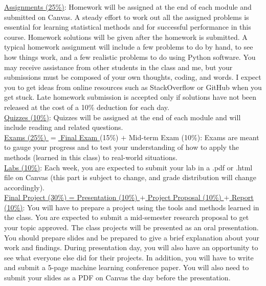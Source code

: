 \documentclass[11pt, a4paper]{article}
\begin{document}
\noindent \underline{Assignments (25\%)}: Homework will be assigned at the end of each module and submitted on Canvas. A steady effort to work out all the assigned problems is essential for learning statistical methods and for successful performance in this course. Homework solutions will be given after the homework is submitted. A typical homework assignment will include a few problems to do by hand, to see how things work, and a few realistic problems to do using Python software. You may receive assistance from other students in the class and me, but your submissions must be composed of your own thoughts, coding, and words. I expect you to get ideas from online resources such as StackOverflow or GitHub when you get stuck. Late homework submission is accepted only if solutions have not been released at the cost of a 10\% deduction for each day. 
\vspace{1mm} \\
\noindent \underline{Quizzes (10\%)}: Quizzes will be assigned at the end of each module and will include reading and related questions. 
\vspace{1mm} \\
\noindent \underline{Exams (25\%) $=$ Final Exam } (15\%) $+$ Mid-term Exam (10\%): Exams are meant to gauge your progress and to test your understanding of how to apply the methods (learned in this class) to real-world situations. \\
\noindent \underline{Labs (10\%)}: Each week, you are expected to submit your lab in a .pdf or .html file on Canvas (this part is subject to change, and grade distribution will change accordingly).
\vspace{1mm} \\
\noindent \underline{Final Project (30\%) = Presentation (10\%) $+$ Project Proposal (10\%) $+$ Report (10\%)}: You will have to prepare a project using the tools and methods learned in the class. You are expected to submit a mid-semester research proposal to get your topic approved. The class projects will be presented as an oral presentation. You should prepare slides and be prepared to give a brief explanation about your work and findings. During presentation day, you will also have an opportunity to see what everyone else did for their projects. In addition, you will have to write and submit a 5-page machine learning conference paper. You will also need to submit your slides as a PDF on Canvas the day before the presentation.
\end{document}
